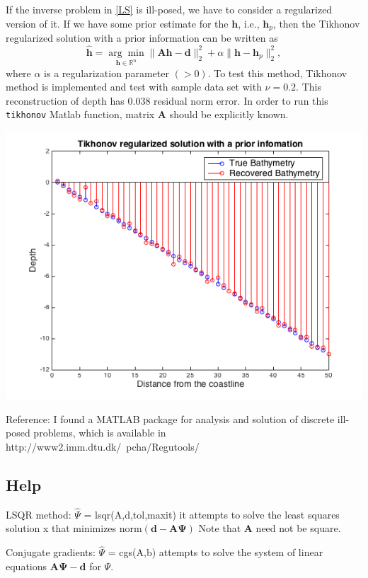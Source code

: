 If the inverse problem in \eqref{LS} is ill-posed, we have to consider a regularized version of it. If we have some prior estimate for the $\mathbf{h}$, i.e., $\mathbf{h}_p$, then the Tikhonov regularized solution with a prior information can be written as
$$
\mathbf{\hat{h}} = \underset{\mathbf{h} \in \mathbb{R}^n}{\arg \min} \|  \mathbf{A}\mathbf{h} -  \mathbf{d} \|_2^2  +  \alpha \| \mathbf{h} -  \mathbf{h}_p\|_2^2,
$$
where $\alpha$ is a regularization parameter $(>0)$. To test this method, Tikhonov method is implemented and test with sample data set with $\nu = 0.2$. This reconstruction of depth has 0.038 residual norm error. In order to run this \verb|tikhonov| Matlab function, matrix $\mathbf{A}$ should be explicitly known.

\begin{center}
\includegraphics[scale=0.6]{img/Tikhnove_reg.png} 
\end{center}

Reference: I found a MATLAB package for analysis and solution of discrete ill-posed problems, which is available in http://www2.imm.dtu.dk/~pcha/Regutools/\\

\subsection{Help}

LSQR method: $\hat{\Psi}$ = lsqr(A,d,tol,maxit) it attempts to solve the least squares solution x that minimizes norm$(\mathbf{d}-\mathbf{A\Psi})$ Note that $\mathbf{A}$ need not be square.


Conjugate gradients: $\hat{\Psi}$ = cgs(A,b) attempts to solve the system of linear equations $\mathbf{A}\mathbf{\Psi} -  \mathbf{d}$ for $\Psi$.

